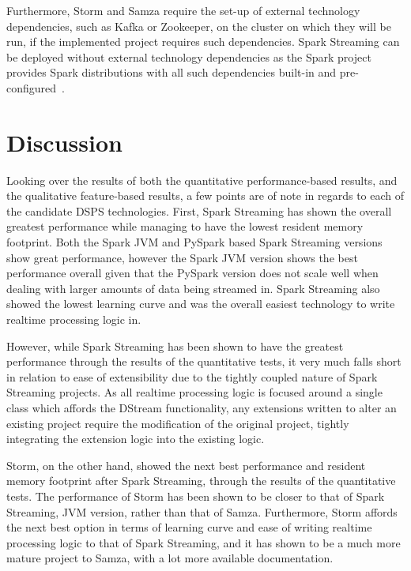 Furthermore, Storm and Samza require the set-up of external technology dependencies, such as Kafka or Zookeeper, on the
cluster on which they will be run, if the implemented project requires such dependencies. Spark Streaming can be deployed
without external technology dependencies as the Spark project provides Spark distributions with all such dependencies built-in
and pre-configured~\cite{web:spark-downloads}.




\section{Discussion} %
\label{sub:eval_discussion}

Looking over the results of both the quantitative performance-based results, and the qualitative feature-based results,
a few points are of note in regards to each of the candidate DSPS technologies. First, Spark Streaming has shown the
overall greatest performance while managing to have the lowest resident memory footprint. Both the Spark JVM and PySpark
based Spark Streaming versions show great performance, however the Spark JVM version shows the best performance overall
given that the PySpark version does not scale well when dealing with larger amounts of data being streamed in.
Spark Streaming also showed the lowest learning curve and was the overall easiest technology to write realtime processing
logic in.

However, while Spark Streaming has been shown to have the greatest performance through the results of the quantitative
tests, it very much falls short in relation to ease of extensibility due to the tightly coupled nature of Spark Streaming
projects. As all realtime processing logic is focused around a single class which affords the DStream functionality,
any extensions written to alter an existing project require the modification of the original project, tightly integrating the
extension logic into the existing logic.

Storm, on the other hand, showed the next best performance and resident memory footprint after Spark Streaming, through
the results of the quantitative tests. The performance of Storm has been shown to be closer to that of Spark Streaming,
JVM version, rather than that of Samza. Furthermore, Storm affords the next best option in terms of learning curve and
ease of writing realtime processing logic to that of Spark Streaming, and it has shown to be a much more mature project
to Samza, with a lot more available documentation.

